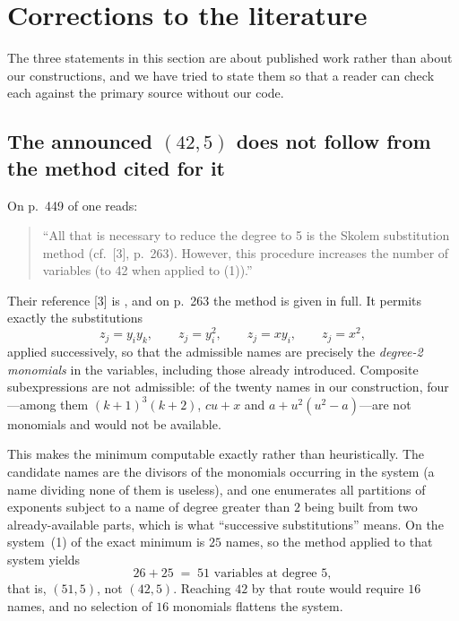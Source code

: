 \section{Corrections to the literature}
\label{sec:correc}

The three statements in this section are about published work rather than about
our constructions, and we have tried to state them so that a reader can check
each against the primary source without our code.

\subsection{The announced \texorpdfstring{$(42,5)$}{(42,5)} does not follow from the method cited for it}

On p.~449 of \cite{jsww1976} one reads:

\begin{quote}
``All that is necessary to reduce the degree to 5 is the Skolem substitution
method (cf.\ [3], p.~263). However, this procedure increases the number of
variables (to 42 when applied to (1)).''
\end{quote}

Their reference [3] is \cite{davis1973}, and on p.~263 the method is given in
full. It permits exactly the substitutions
\[
  z_j=y_iy_k,\qquad z_j=y_i^2,\qquad z_j=xy_i,\qquad z_j=x^2 ,
\]
applied successively, so that the admissible names are precisely the
\emph{degree-2 monomials} in the variables, including those already introduced.
Composite subexpressions are not admissible: of the twenty names in our
construction, four---among them $(k+1)^3(k+2)$, $cu+x$ and $a+u^2(u^2-a)$---are
not monomials and would not be available.

This makes the minimum computable exactly rather than heuristically. The
candidate names are the divisors of the monomials occurring in the system (a
name dividing none of them is useless), and one enumerates all partitions of
exponents subject to a name of degree greater than $2$ being built from two
already-available parts, which is what ``successive substitutions'' means. On
the system~(1) of \cite{jsww1976} the exact minimum is $25$ names, so the method
applied to that system yields
\[
  26+25 \;=\; 51 \text{ variables at degree } 5 ,
\]
that is, $(51,5)$, not $(42,5)$. Reaching $42$ by that route would require $16$
names, and no selection of $16$ monomials flattens the system.

